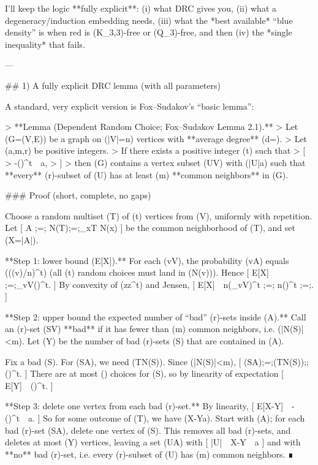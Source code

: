 I’ll keep the logic **fully explicit**: (i) what DRC gives you, (ii) what a degeneracy/induction embedding needs, (iii) what the *best available* “blue density” is when red is (K_{3,3})-free or (Q_3)-free, and then (iv) the *single inequality* that fails.

---

## 1) A fully explicit DRC lemma (with all parameters)

A standard, very explicit version is Fox–Sudakov’s “basic lemma”:

> **Lemma (Dependent Random Choice; Fox–Sudakov Lemma 2.1).**
> Let (G=(V,E)) be a graph on (|V|=n) vertices with **average degree** (d=).
> Let (a,m,r) be positive integers.
> If there exists a positive integer (t) such that
> [
> -\left(\right)^{t}\ \ge\ a,
> ]
> then (G) contains a vertex subset (U\subseteq V) with (|U|\ge a) such that **every** (r)-subset of (U) has at least (m) **common neighbors** in (G).

### Proof (short, complete, no gaps)

Choose a random multiset (T) of (t) vertices from (V), uniformly with repetition. Let
[
A ;=; N(T);=;\bigcap_{x\in T} N(x)
]
be the common neighborhood of (T), and set (X=|A|).

**Step 1: lower bound (\mathbb E[X]).**
For each (v\in V), the probability (v\in A) equals ((\deg(v)/n)^t) (all (t) random choices must land in (N(v))). Hence
[
\mathbb E[X] ;=;\sum_{v\in V}\left(\right)^t.
]
By convexity of (z\mapsto z^t) and Jensen,
[
\mathbb E[X]\ \ge\ n\left(\sum_{v\in V}\right)^t
;=; n\left(\right)^t
;=;.
]

**Step 2: upper bound the expected number of “bad” (r)-sets inside (A).**
Call an (r)-set (S\subseteq V) **bad** if it has fewer than (m) common neighbors, i.e. (|N(S)|<m).
Let (Y) be the number of bad (r)-sets (S) that are contained in (A).

Fix a bad (S). For (S\subseteq A), we need (T\subseteq N(S)). Since (|N(S)|<m),
[
\Pr(S\subseteq A);=;\Pr(T\subseteq N(S));\le;\left(\right)^t.
]
There are at most () choices for (S), so by linearity of expectation
[
\mathbb E[Y]\ \le\ \left(\right)^t.
]

**Step 3: delete one vertex from each bad (r)-set.**
By linearity,
[
\mathbb E[X-Y]\ \ge\ -\left(\right)^t\ \ge\ a.
]
So for some outcome of (T), we have (X-Y\ge a). Start with (A); for each bad (r)-set (S\subseteq A), delete one vertex of (S). This removes all bad (r)-sets, and deletes at most (Y) vertices, leaving a set (U\subseteq A) with
[
|U|\ \ge\ X-Y\ \ge\ a
]
and with **no** bad (r)-set, i.e. every (r)-subset of (U) has (\ge m) common neighbors. ∎

